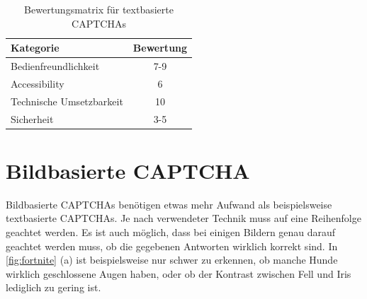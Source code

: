 \begin{table}[h!]
    \caption{Bewertungsmatrix für textbasierte CAPTCHAs}
    \begin{center}
        \begin{tabular}{l|c}
            Kategorie                       & Bewertung \\\hline
            Bedienfreundlichkeit            & 7-9         \\
            Accessibility                   & 6        \\
            Technische Umsetzbarkeit        & 10         \\
            Sicherheit                      & 3-5         
        \end{tabular}
    \end{center}
    \label{table:matrix:text}
\end{table}

\section{Bildbasierte CAPTCHA}
\label{ch:bewertung:bild}
Bildbasierte CAPTCHAs benötigen etwas mehr Aufwand als beispielsweise textbasierte CAPTCHAs.
Je nach verwendeter Technik muss auf eine Reihenfolge geachtet werden. 
Es ist auch möglich, dass bei einigen Bildern genau darauf geachtet werden muss, ob die gegebenen Antworten wirklich korrekt sind.
In \autoref{fig:fortnite} (a) ist beispielsweise nur schwer zu erkennen, ob manche Hunde wirklich geschlossene Augen haben, 
oder ob der Kontrast zwischen Fell und Iris lediglich zu gering ist.

